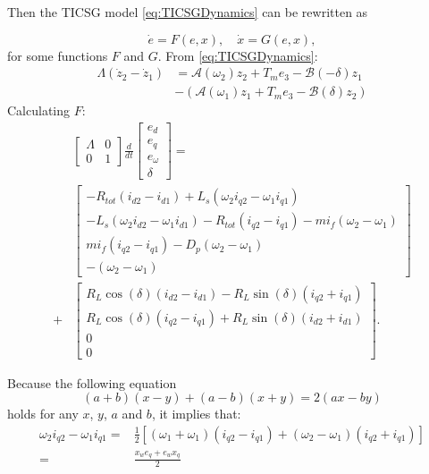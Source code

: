 \documentclass[letterpaper, 10 pt, conference]{ieeeconf}
\begin{document}
Then the TICSG model \eqref{eq:TICSGDynamics} can be rewritten as

\begin{equation}
\dot{e}=F(e,x) , \quad \dot{x}=G(e,x),\label{eq:sync_sestem}
\end{equation}
for some functions $F$ and $G$.  From \eqref{eq:TICSGDynamics}:
$$
\begin{aligned}
\Lambda(\dot{z}_{2}-\dot{z}_{1})&=\mathcal{A}(\omega_{2})z_{2}+T_{m}e_{3}-\mathcal{B}(-\delta)z_{1}\\&-\left(\mathcal{A}(\omega_{1})z_{1}+T_{m}e_{3}-\mathcal{B}(\delta)z_{2}\right)
\end{aligned}
$$
Calculating  $F$:
$$
\begin{aligned}
&  \left[\begin{array}{cc}
\varLambda & 0\\
0 & 1
\end{array}\right] \frac{d}{dt}\left[\begin{array}{c}
e_{d}\\
e_{q}\\
e_{\omega}\\
\delta
\end{array}\right]  =  \\ & \left[\begin{array}{c}
-R_{tot}(i_{d2}-i_{d1})+L_{s}(\omega_{2}i_{q2}-\omega_{1}i_{q1})\\
-L_{s}(\omega_{2}i_{d2}-\omega_{1}i_{d1})-R_{tot}(i_{q2}-i_{q1})-mi_{f}(\omega_{2}-\omega_{1})\\
mi_{f}(i_{q2}-i_{q1})-D_{p}(\omega_{2}-\omega_{1})\\
-(\omega_{2}-\omega_{1})
\end{array}\right]\\
 + & \left[\begin{array}{c}
R_{L}\cos(\delta)(i_{d2}-i_{d1})-R_{L}\sin(\delta)(i_{q2}+i_{q1})\\
R_{L}\cos(\delta)(i_{q2}-i_{q1})+R_{L}\sin(\delta)(i_{d2}+i_{d1})\\
0\\
0
\end{array}\right].
\end{aligned}
$$

Because the following equation   
$$(a+b)(x-y)+(a-b)(x+y)=2(ax-by)$$
holds for any $x$, $y$, $a$ and $b$, it implies that:
$$
\begin{aligned}
\omega_{2}i_{q2}-\omega_{1}i_{q1}= &\frac{1}{2}\left[(\omega_{1}+\omega_{1})(i_{q2}-i_{q1})+(\omega_{2}-\omega_{1})(i_{q2}+i_{q1})\right] \\ =&\frac{x_{w}e_{q}+e_{w}x_{q}}{2}
\end{aligned}
$$
 
\end{document}
